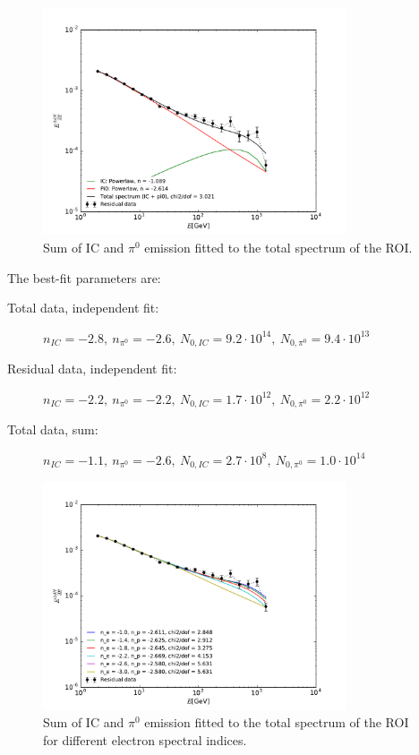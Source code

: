\documentclass[a4paper]{article}
\begin{document}
\begin{figure}[h]
	\centering
	\includegraphics[width=0.8\textwidth]{TotalData_Sum_new_best.pdf}
    \caption{Sum of IC and $\pi^0$ emission fitted to the total spectrum of the ROI.}
    \label{TotalData_Sum}
\end{figure}

The best-fit parameters are:
\begin{description}
\item[Total data, independent fit:] $n_{IC} = -2.8,\ n_{\pi^0} = -2.6,\ N_{0, IC} = 9.2 \cdot 10^{14},\ N_{0, \pi^0} = 9.4 \cdot 10^{13}$
\item[Residual data, independent fit:] $n_{IC} = -2.2,\ n_{\pi^0} = -2.2,\ N_{0, IC} = 1.7 \cdot 10^{12},\ N_{0, \pi^0} = 2.2 \cdot 10^{12}$
\item[Total data, sum:] $n_{IC} = -1.1,\ n_{\pi^0} = -2.6,\ N_{0, IC} = 2.7 \cdot 10^{8},\ N_{0, \pi^0} = 1.0 \cdot 10^{14}$\\
\end{description}

\begin{figure}[h]
	\centering
	\includegraphics[width=0.8\textwidth]{TotalData_Sum_IC_n_fixed.pdf}
    \caption{Sum of IC and $\pi^0$ emission fitted to the total spectrum of the ROI for different electron spectral indices.}
    \label{TotalData_Sum}
\end{figure}
\end{document}
